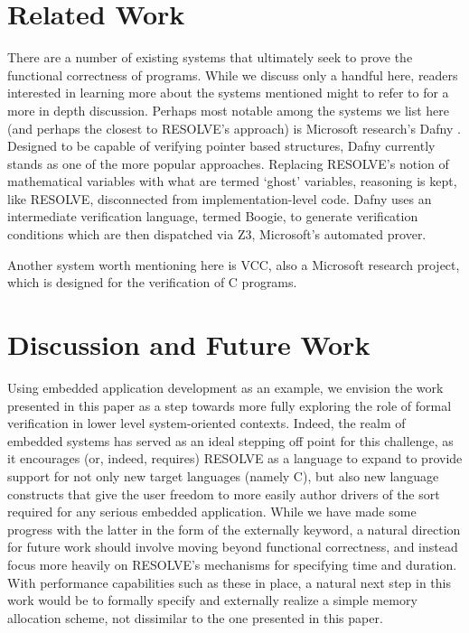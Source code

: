 \section{Related Work}

There are a number of existing systems that ultimately seek to prove the functional correctness of programs. While we discuss only a handful here, readers interested in learning more about the systems mentioned might to refer to \cite{klebanov:2011} for a more in depth discussion. Perhaps most notable among the systems we list here (and perhaps the closest to RESOLVE's approach) is Microsoft research's Dafny \cite{leino:2010}. Designed to be capable of verifying pointer based structures, Dafny currently stands as one of the more popular approaches. Replacing RESOLVE's notion of mathematical variables with what are termed `ghost' variables, reasoning is kept, like RESOLVE, disconnected from implementation-level code. Dafny uses an intermediate verification language, termed Boogie, to generate verification conditions which are then dispatched via Z3, Microsoft's automated prover. 

Another system worth mentioning here is VCC, also a Microsoft research project, which is designed for the verification of C programs. 


\section{Discussion and Future Work}

Using embedded application development as an example, we envision the work presented in this paper as a step towards more fully exploring the role of formal verification in lower level system-oriented contexts. Indeed, the realm of embedded systems has served as an ideal stepping off point for this challenge, as it encourages (or, indeed, requires) RESOLVE as a language to expand to provide support for not only new target languages (namely C), but also new language constructs that give the user freedom to more easily author drivers of the sort required for any serious embedded application. While we have made some progress with the latter in the form of the externally keyword, a natural direction for future work should involve moving beyond functional correctness, and instead focus more heavily on RESOLVE's mechanisms for specifying time and duration. With performance capabilities such as these in place, a natural next step in this work would be to formally specify and externally realize a simple memory allocation scheme, not dissimilar to the one presented in this paper.

